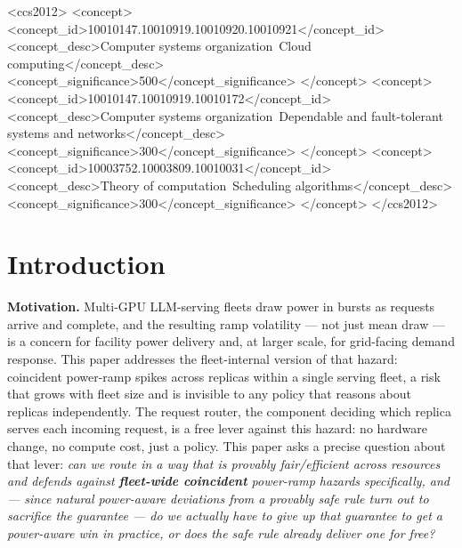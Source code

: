 \documentclass[sigconf,review,anonymous]{acmart}
\begin{document}
\begin{CCSXML}
<ccs2012>
   <concept>
       <concept_id>10010147.10010919.10010920.10010921</concept_id>
       <concept_desc>Computer systems organization~Cloud computing</concept_desc>
       <concept_significance>500</concept_significance>
   </concept>
   <concept>
       <concept_id>10010147.10010919.10010172</concept_id>
       <concept_desc>Computer systems organization~Dependable and fault-tolerant systems and networks</concept_desc>
       <concept_significance>300</concept_significance>
   </concept>
   <concept>
       <concept_id>10003752.10003809.10010031</concept_id>
       <concept_desc>Theory of computation~Scheduling algorithms</concept_desc>
       <concept_significance>300</concept_significance>
   </concept>
</ccs2012>
\end{CCSXML}



\maketitle

\section{Introduction}

\textbf{Motivation.} Multi-GPU LLM-serving fleets draw power in bursts as requests arrive and
complete, and the resulting ramp volatility --- not just mean draw --- is a concern for
facility power delivery and, at larger scale, for grid-facing demand response. This paper
addresses the fleet-internal version of that hazard: coincident power-ramp spikes across
replicas within a single serving fleet, a risk that grows with fleet size and is invisible to
any policy that reasons about replicas independently. The request router, the component
deciding which replica serves each incoming request, is a free lever against this hazard: no
hardware change, no compute cost, just a policy. This paper asks a precise question about that
lever: \emph{can we route in a way that
is provably fair/efficient across resources and defends against \textbf{fleet-wide coincident}
power-ramp hazards specifically, and --- since natural power-aware deviations from a provably
safe rule turn out to sacrifice the guarantee --- do we actually have to give up that
guarantee to get a power-aware win in practice, or does the safe rule already deliver one for
free?}
\end{document}

